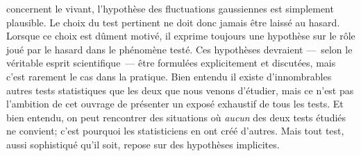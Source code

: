 concernent le vivant, l'hypoth\`ese des fluctuations gaussiennes est
simplement plausible. 
\medskip
Le choix du test pertinent ne doit donc jamais \^etre laiss\'e au hasard.
Lorsque ce choix est d\^ument motiv\'e, il exprime toujours une 
hypoth\`ese sur le r\^ole jou\'e par le hasard dans le ph\'enom\`ene
test\'e. Ces hypoth\`eses devraient ---~selon le v\'eritable esprit
scientifique~--- \^etre formul\'ees explicitement et discut\'ees, mais
c'est rarement le cas dans la pratique. 
\medskip
Bien entendu il existe d'innombrables autres tests statistiques que les
deux que nous venons d'\'etudier, mais ce n'est pas l'ambition de cet
ouvrage de pr\'esenter un expos\'e exhaustif de tous les tests. Et bien
entendu, on peut rencontrer des situations o\`u {\it aucun} des
deux tests \'etudi\'es ne convient; c'est pourquoi les statisticiens en 
ont cr\'e\'e d'autres. Mais tout test, aussi sophistiqu\'e qu'il soit, 
repose sur des hypoth\`eses implicites.






\bye
